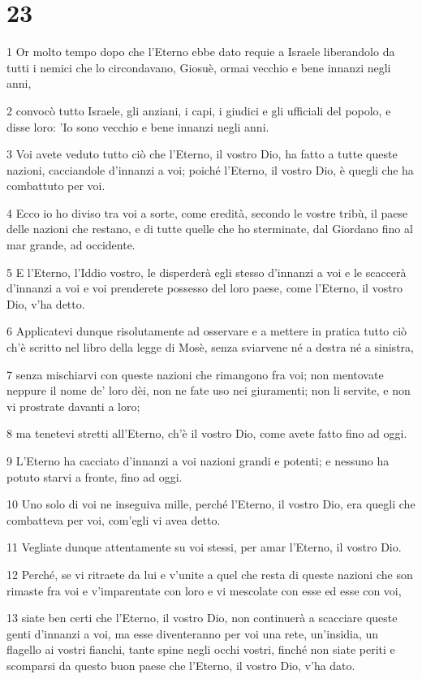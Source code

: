 \chapter{23}

\par 1 Or molto tempo dopo che l'Eterno ebbe dato requie a Israele liberandolo da tutti i nemici che lo circondavano, Giosuè, ormai vecchio e bene innanzi negli anni,
\par 2 convocò tutto Israele, gli anziani, i capi, i giudici e gli ufficiali del popolo, e disse loro: 'Io sono vecchio e bene innanzi negli anni.
\par 3 Voi avete veduto tutto ciò che l'Eterno, il vostro Dio, ha fatto a tutte queste nazioni, cacciandole d'innanzi a voi; poiché l'Eterno, il vostro Dio, è quegli che ha combattuto per voi.
\par 4 Ecco io ho diviso tra voi a sorte, come eredità, secondo le vostre tribù, il paese delle nazioni che restano, e di tutte quelle che ho sterminate, dal Giordano fino al mar grande, ad occidente.
\par 5 E l'Eterno, l'Iddio vostro, le disperderà egli stesso d'innanzi a voi e le scaccerà d'innanzi a voi e voi prenderete possesso del loro paese, come l'Eterno, il vostro Dio, v'ha detto.
\par 6 Applicatevi dunque risolutamente ad osservare e a mettere in pratica tutto ciò ch'è scritto nel libro della legge di Mosè, senza sviarvene né a destra né a sinistra,
\par 7 senza mischiarvi con queste nazioni che rimangono fra voi; non mentovate neppure il nome de' loro dèi, non ne fate uso nei giuramenti; non li servite, e non vi prostrate davanti a loro;
\par 8 ma tenetevi stretti all'Eterno, ch'è il vostro Dio, come avete fatto fino ad oggi.
\par 9 L'Eterno ha cacciato d'innanzi a voi nazioni grandi e potenti; e nessuno ha potuto starvi a fronte, fino ad oggi.
\par 10 Uno solo di voi ne inseguiva mille, perché l'Eterno, il vostro Dio, era quegli che combatteva per voi, com'egli vi avea detto.
\par 11 Vegliate dunque attentamente su voi stessi, per amar l'Eterno, il vostro Dio.
\par 12 Perché, se vi ritraete da lui e v'unite a quel che resta di queste nazioni che son rimaste fra voi e v'imparentate con loro e vi mescolate con esse ed esse con voi,
\par 13 siate ben certi che l'Eterno, il vostro Dio, non continuerà a scacciare queste genti d'innanzi a voi, ma esse diventeranno per voi una rete, un'insidia, un flagello ai vostri fianchi, tante spine negli occhi vostri, finché non siate periti e scomparsi da questo buon paese che l'Eterno, il vostro Dio, v'ha dato.
